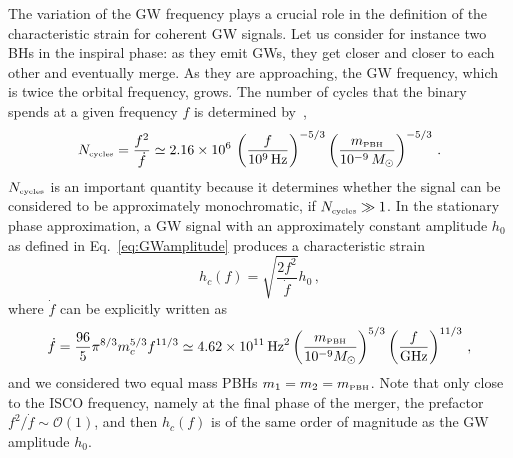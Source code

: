 \documentclass[11pt,a4paper]{article}
\begin{document}
The variation of the GW frequency plays a crucial role in the definition of the characteristic strain for coherent GW signals. Let us consider for instance  two BHs in the inspiral phase: as they emit GWs, they get closer and closer to each other and eventually merge. As they are approaching, the GW frequency, which is twice the orbital frequency, grows. The number of cycles that the binary spends at a given frequency $f$ is determined by~\cite{Moore:2014lga},
\begin{equation}
\label{eq:Ncycles}
N_\text{\tiny cycles} = \frac{f^2}{\dot{f}} \simeq 2.16 \times 10^6 \, \left(\frac{f}{10^9 \, \text{Hz}}\right)^{-5/3} \left(\frac{m_\text{\tiny PBH}}{10^{-9} \, M_\odot}\right)^{-5/3} \,.
\end{equation}
$N_\text{\tiny cycles}$ is an important quantity because it determines whether the signal can be considered to be approximately monochromatic, if $N_\text{\tiny cycles} \gg 1$. 
In the stationary phase approximation, a GW signal with an approximately constant amplitude $h_0$ as defined in Eq.~\eqref{eq:GWamplitude} produces a characteristic strain
\begin{equation}
\label{eq:StrainInspirals}
h_c(f) = \sqrt{\frac{2 f^2}{\dot{f}}} h_0 \,,
\end{equation}
where $\dot{f}$ can be explicitly written as~\cite{Maggiore:1900zz}
\begin{equation}
\label{eq:dotf}
\dot{f} = \frac{96}{5} \pi^{8/3} m_c^{5/3} f^{11/3} \simeq 4.62 \times 10^{11} \, \text{Hz}^2 \left(\frac{m_\text{\tiny PBH}}{10^{-9} M_\odot}\right)^{5/3} \left(\frac{f}{\text{GHz}}\right)^{11/3}\,,
\end{equation}
and  we considered two equal mass PBHs $m_1 = m_2 = m_\text{\tiny PBH}$.
Note that only close to the ISCO frequency, 
namely at the final phase of the merger, 
the prefactor $f^2/\dot{f} \sim \mathcal{O}(1)$, and then $h_c (f)$ is of the same order of magnitude as the GW amplitude $h_0$.\\
\end{document}
